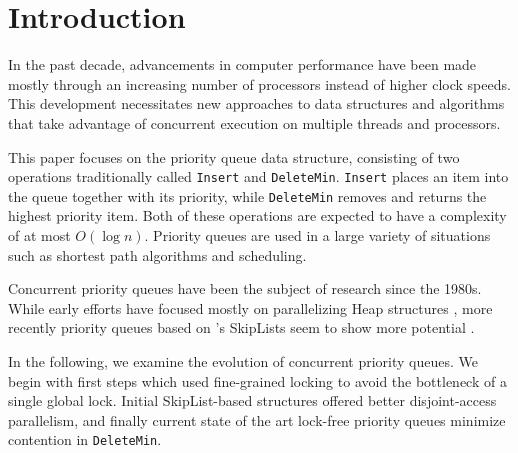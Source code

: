 \documentclass[a4paper,10pt]{article}
\begin{document}
\section{Introduction}


In the past decade, advancements in computer performance have been made mostly
through an increasing number of processors instead of higher clock speeds.
This development necessitates new approaches to data structures and algorithms
that take advantage of concurrent execution on multiple threads and processors. 


This paper focuses on the priority queue data structure, consisting of two operations
traditionally called \lstinline|Insert| and \lstinline|DeleteMin|. \lstinline|Insert|
places an item into the queue together with its priority, while \lstinline|DeleteMin|
removes and returns the highest priority item. Both of these operations are expected to have
a complexity of at most $O(\log n)$. Priority queues are used in a large variety
of situations such as shortest path algorithms and scheduling. %


Concurrent priority queues have been the subject of research since the 1980s.
While early efforts have focused mostly on parallelizing Heap structures
\cite{hunt1996efficient}, %
more recently priority queues based on \citeauthor{pugh1990skip}'s SkipLists
\cite{pugh1990skip} seem to show more potential \cite{shavit2000skiplist,
sundell2003fast,herlihy2012art,linden2013skiplist}.


In the following, we examine the evolution of concurrent priority queues. We begin
with first steps which used fine-grained locking to avoid the bottleneck of a single
global lock. Initial SkipList-based structures offered better disjoint-access
parallelism, and finally current state of the art lock-free priority queues minimize
contention in \lstinline|DeleteMin|.

\end{document}
